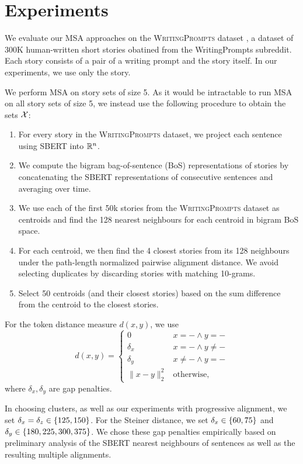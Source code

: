 \documentclass{article}
\begin{document}
\section{Experiments}
We evaluate our MSA approaches on the \textsc{WritingPrompts} dataset \citep{fan2018writingprompts},
a dataset of 300K human-written short stories obatined from the WritingPrompts subreddit.
Each story consists of a pair of a writing prompt and the story itself.
In our experiments, we use only the story.

We perform MSA on story sets of size 5.
As it would be intractable to run MSA on all story sets of size 5,
we instead use the following procedure to obtain the sets $\mathcal{X}$:
\begin{enumerate}
\item For every story in the \textsc{WritingPrompts} dataset,
we project each sentence using SBERT \citep{reimers2019sbert} into $\mathbb{R}^n$.
\item We compute the bigram bag-of-sentence (BoS) representations of stories by
concatenating the SBERT representations of consecutive sentences and averaging over time.
\item We use each of the first 50k stories from the \textsc{WritingPrompts} dataset as centroids
and find the 128 nearest neighbours for each centroid in bigram BoS space.
\item For each centroid, we then find the 4 closest stories from its 128 neighbours
under the path-length normalized pairwise alignment distance.
We avoid selecting duplicates by discarding stories with matching 10-grams.
\item Select 50 centroids (and their closest stories) based on the sum
difference from the centroid to the closest stories.
\end{enumerate}

For the token distance measure $d(x, y)$,
we use
\begin{equation} 
d(x,y) = \begin{cases}
0 & x=- \wedge y=-\\
\delta_x & x=- \wedge y\ne- \\
\delta_y & x\ne- \wedge y = -\\
\|x-y\|_2^2 & \mathrm{otherwise,}
\end{cases}
\end{equation}
where $\delta_x,\delta_y$ are gap penalties.

In choosing clusters, as well as our experiments with progressive alignment,
we set $\delta_x=\delta_z \in \left\{125, 150\right\}$.
For the Steiner distance, we set $\delta_x \in \left\{60, 75\right\}$
and $\delta_y \in \left\{180, 225, 300, 375\right\}$.
We chose these gap penalties empirically based on preliminary analysis of the SBERT
nearest neighbours of sentences as well as the resulting multiple alignments.
\end{document}
